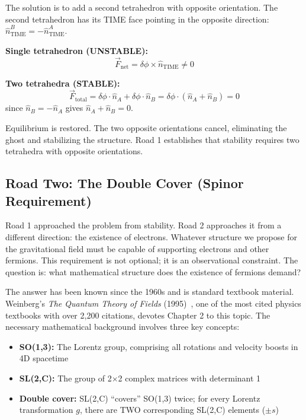 \documentclass[aps,prd,preprint,superscriptaddress,showpacs,preprintnumbers,amsmath,amssymb,nofootinbib]{revtex4-2}
\begin{document}
The solution is to add a second tetrahedron with opposite orientation. The second tetrahedron has its TIME face pointing in the opposite direction: $\hat{n}_{\text{TIME}}^B = -\hat{n}_{\text{TIME}}^A$.

\textbf{Single tetrahedron (UNSTABLE):}
\begin{equation}
\vec{F}_{\text{net}} = \delta\phi \times \hat{n}_{\text{TIME}} \neq 0
\end{equation}

\textbf{Two tetrahedra (STABLE):}
\begin{equation}
\vec{F}_{\text{total}} = \delta\phi \cdot \hat{n}_A + \delta\phi \cdot \hat{n}_B = \delta\phi \cdot (\hat{n}_A + \hat{n}_B) = 0
\end{equation}
since $\hat{n}_B = -\hat{n}_A$ gives $\hat{n}_A + \hat{n}_B = 0$.

Equilibrium is restored. The two opposite orientations cancel, eliminating the ghost and stabilizing the structure. Road 1 establishes that stability requires two tetrahedra with opposite orientations.

\subsection{Road Two: The Double Cover (Spinor Requirement)}
\label{subsec:road-double-cover}

Road 1 approached the problem from stability. Road 2 approaches it from a different direction: the existence of electrons. Whatever structure we propose for the gravitational field must be capable of supporting electrons and other fermions. This requirement is not optional; it is an observational constraint. The question is: what mathematical structure does the existence of fermions demand?

The answer has been known since the 1960s and is standard textbook material. Weinberg's \emph{The Quantum Theory of Fields} (1995)~\cite{weinberg1995}, one of the most cited physics textbooks with over 2,200 citations, devotes Chapter 2 to this topic. The necessary mathematical background involves three key concepts:

\begin{itemize}
\item \textbf{SO(1,3):} The Lorentz group, comprising all rotations and velocity boosts in 4D spacetime
\item \textbf{SL(2,C):} The group of 2$\times$2 complex matrices with determinant 1
\item \textbf{Double cover:} SL(2,C) ``covers'' SO(1,3) twice; for every Lorentz transformation $g$, there are TWO corresponding SL(2,C) elements ($\pm s$)
\end{itemize}
\end{document}

